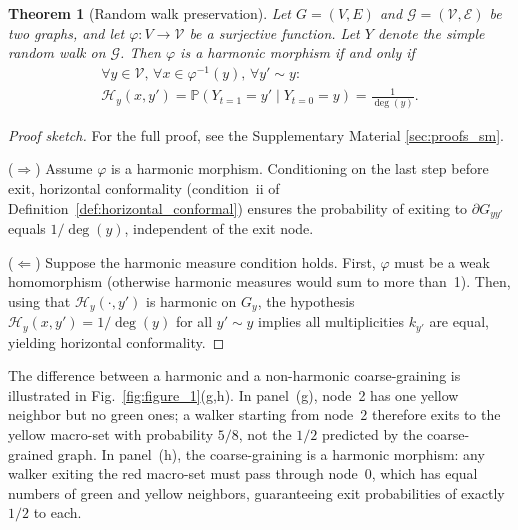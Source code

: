 \documentclass[twocolumn,superscriptaddress,tightenlines,aps,prx,floatfix]{revtex4-2}
\newtheorem{theorem}{Theorem}
\begin{document}
\begin{bibunit}
\begin{theorem}[Random walk preservation]
\label{theo:RW_preservation}
Let $G=(V,E)$ and $\mathcal{G}=(\mathcal{V},\mathcal{E})$ be two graphs, and let $\varphi: V \rightarrow \mathcal{V}$ be a surjective function. 
Let $Y$ denote the simple random walk on $\mathcal{G}$. 
Then $\varphi$ is a harmonic morphism if and only if
\begin{eqnarray}
\forall y \in \mathcal{V}, \, \forall x \in \varphi^{-1}(y), \, \forall y' \sim y: \quad \nonumber \\ 
\mathcal{H}_y(x, y') = \mathbb{P}(Y_{t=1} = y' \mid Y_{t=0} = y) = \frac{1}{\deg(y)}.
\end{eqnarray}
\end{theorem}

\begin{proof}[Proof sketch]
For the full proof, see the Supplementary Material \ref{sec:proofs_sm}.

($\Rightarrow$) Assume $\varphi$ is a harmonic morphism. 
Conditioning on the last step before exit, horizontal conformality (condition~ii of Definition~\ref{def:horizontal_conformal}) ensures the probability of exiting to $\partial G_{yy'}$ equals $1/\deg(y)$, independent of the exit node.

($\Leftarrow$) Suppose the harmonic measure condition holds. First, $\varphi$ must be a weak homomorphism (otherwise harmonic measures would sum to more than~1). Then, using that $\mathcal{H}_y(\cdot, y')$ is harmonic on $G_y$, the hypothesis $\mathcal{H}_y(x,y') = 1/\deg(y)$ for all $y' \sim y$ implies all multiplicities $k_{y'}$ are equal, yielding horizontal conformality.
\end{proof}

The difference between a harmonic and a non-harmonic coarse-graining is illustrated in Fig.~\ref{fig:figure_1}(g,h). 
In panel~(g), node~2 has one yellow neighbor but no green ones; a walker starting from node~2 therefore exits to the yellow macro-set with probability $5/8$, not the $1/2$ predicted by the coarse-grained graph. 
In panel~(h), the coarse-graining is a harmonic morphism: any walker exiting the red macro-set must pass through node~0, which has equal numbers of green and yellow neighbors, guaranteeing exit probabilities of exactly $1/2$ to each.


\end{bibunit}
\end{document}
